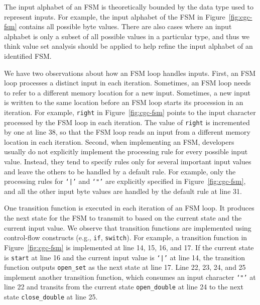 The input alphabet of an FSM is theoretically bounded by 
the data type used to represent inputs. 
For example, the input alphabet of the FSM
in Figure~\ref{fig:cgc-fsm} contains all possible byte values.
There are also cases where an input alphabet is only a subset 
of all possible values in a particular type, 
and thus we think value set analysis should be applied to help refine
the input alphabet of an identified FSM.


We have two observations about how an FSM loop handles inputs. 
First, an FSM loop processes a distinct input in each iteration.
Sometimes, an FSM loop needs to refer to a different 
memory location for a new input.
Sometimes, a new input is written to the same
location before an FSM loop 
starts its procession in an iteration.
For example, \texttt{right} in Figure~\ref{fig:cgc-fsm} 
points to the input character
processed by the FSM loop in each iteration.
The value of \texttt{right} is incremented by one at line 38,
so that the FSM loop reads an input from a different memory 
location in each iteration.
Second, when implementing an FSM,
developers usually do not explicitly implement the 
processing rule for every possible input value. 
Instead,
they tend to specify rules only for several important input values and 
leave the others to be handled by a default rule.
For example, only the processing rules for \texttt{`|'} and \texttt{`"'}
are explicitly specified in Figure~\ref{fig:cgc-fsm},
and all the other input byte values are handled by
the default rule at line 31.


One transition function is executed in each iteration of an FSM loop. 
It produces the next state for the FSM to transmit to based on 
the current state and the current input value. 
We observe that transition functions are implemented
using control-flow constructs (e.g., \texttt{if}, \texttt{switch}).
For example, a transition function in Figure~\ref{fig:cgc-fsm}
is implemented at line 14, 15, 16, and 17.
If the current state is \texttt{start}
at line 16 and the current input value is
\texttt{`|'} at line 14, the transition function outputs \texttt{open\_set}
as the next state at line 17.
Line 22, 23, 24, and 25 implement another transition function,
which consumes an input character \texttt{`"'} at line 22 and
transits from the current state
\texttt{open\_double} at line 24 to
the next state \texttt{close\_double} at line 25.



